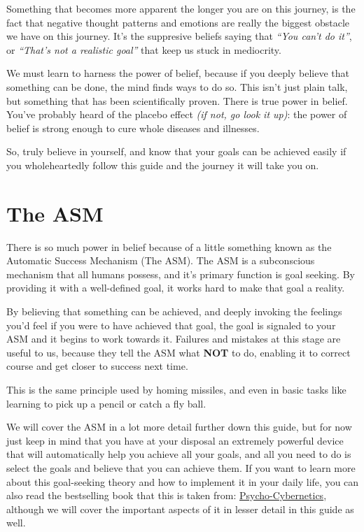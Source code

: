 \documentclass[
]{book}
\begin{document}
Something that becomes more apparent the longer you are on this journey, is the fact that negative thought patterns and emotions are really the biggest obstacle we have on this journey. It's the suppresive beliefs saying that \emph{``You can't do it''}, or \emph{``That's not a realistic goal''} that keep us stuck in mediocrity.

We must learn to harness the power of belief, because if you deeply believe that something can be done, the mind finds ways to do so. This isn't just plain talk, but something that has been scientifically proven. There is true power in belief. You've probably heard of the placebo effect \emph{(if not, go look it up)}: the power of belief is strong enough to cure whole diseases and illnesses.

So, truly believe in yourself, and know that your goals can be achieved easily if you wholeheartedly follow this guide and the journey it will take you on.

\hypertarget{the-asm}{%
\section{The ASM}\label{the-asm}}

There is so much power in belief because of a little something known as the Automatic Success Mechanism (The ASM). The ASM is a subconscious mechanism that all humans possess, and it's primary function is goal seeking. By providing it with a well-defined goal, it works hard to make that goal a reality.

By believing that something can be achieved, and deeply invoking the feelings you'd feel if you were to have achieved that goal, the goal is signaled to your ASM and it begins to work towards it. Failures and mistakes at this stage are useful to us, because they tell the ASM what \textbf{NOT} to do, enabling it to correct course and get closer to success next time.

This is the same principle used by homing missiles, and even in basic tasks like learning to pick up a pencil or catch a fly ball.

We will cover the ASM in a lot more detail further down this guide, but for now just keep in mind that you have at your disposal an extremely powerful device that will automatically help you achieve all your goals, and all you need to do is select the goals and believe that you can achieve them. If you want to learn more about this goal-seeking theory and how to implement it in your daily life, you can also read the bestselling book that this is taken from: \href{https://ia601903.us.archive.org/26/items/TheNewPsychoCyberneticsByMaxwellMaltz1/The\%20New\%20Psycho-Cybernetics\%20by\%20Maxwell\%20Maltz\%20\%20\%281\%29.pdf}{Psycho-Cybernetics}, although we will cover the important aspects of it in lesser detail in this guide as well.
\end{document}
